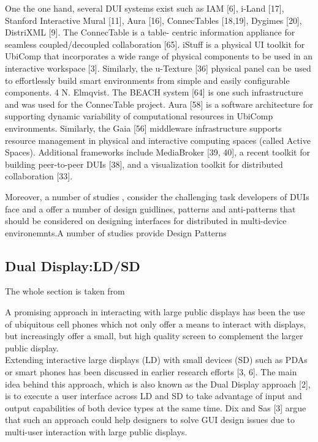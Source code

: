 \cite{demeure20084c} One the one hand, several DUI systems exist such as IAM
[6], i-Land [17], Stanford Interactive Mural [11], Aura [16], ConnecTables [18,19], Dygimes [20], DistriXML [9].
\cite{elmqvist2011distributed} The ConnecTable is a table- centric information appliance for seamless coupled/decoupled collaboration [65]. iStuff is a physical UI toolkit for UbiComp that incorporates a wide range of physical components to be used in an interactive workspace [3]. Similarly, the u-Texture [36] physical panel can be used to effortlessly build smart environments from simple and easily configurable components.
4 N. Elmqvist. The BEACH system [64] is one such infrastructure and was used for
the ConnecTable project. Aura [58] is a software architecture for supporting dynamic variability of computational resources in UbiComp environments. Similarly, the Gaia [56] middleware infrastructure supports resource management in physical and interactive computing spaces (called Active Spaces). Additional frameworks include MediaBroker [39, 40], a recent toolkit for building peer-to-peer DUIs [38], and a visualization toolkit for distributed collaboration [33].

Moreover, a number of studies \cite{seifried2011lessons},
\cite{vanderdonckt2010distributed} consider the challenging task developers of DUIs face and a offer a number of design guidlines, patterns and anti-patterns that should be considered on designing interfaces for distributed in multi-device environemnts.A number of studies provide Design Patterns\\

\subsection{Dual Display:LD/SD}
The whole section is taken from \cite{kaviani2011dual}

A promising approach in interacting with large public displays has been the use
of ubiquitous cell phones which not only offer a means to interact with
displays, but increasingly offer a small, but high quality screen to complement
the larger public display.\\

Extending interactive large displays (LD) with small devices (SD) such as PDAs
or smart phones has been discussed in earlier research efforts [3, 6]. The main
idea behind this approach, which is also known as the Dual Display approach [2],
is to execute a user interface across LD and SD to take advantage of input and
output capabilities of both device types at the same time. Dix and Sas [3] argue
that such an approach could help designers to solve GUI design issues due to multi-user interaction with large public displays.\\

